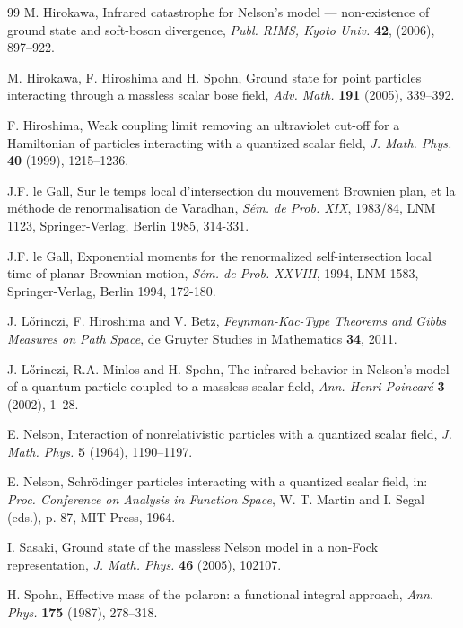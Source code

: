 \documentclass[12pt]{article}
\providecommand{\1}{\mathbb{1}}
\begin{document}
{\begin{thebibliography}{99}
M. Hirokawa,
Infrared catastrophe for Nelson's model --- non-existence of ground state and soft-boson
divergence, {\it Publ. RIMS, Kyoto Univ.}  \textbf{42},  (2006), 897--922.


M. Hirokawa, F. Hiroshima and H. Spohn,
Ground state for point particles interacting through a massless scalar bose field,
{\it Adv. Math.} {\bf 191} (2005), 339--392.

F. Hiroshima,
Weak coupling limit removing an ultraviolet cut-off for a Hamiltonian of
particles interacting with a quantized scalar field, {\it  J. Math. Phys.} {\bf  40}
(1999), 1215--1236.


  J.F. le Gall, Sur le temps local d'intersection du
mouvement Brownien plan, et la m\'{e}thode de renormalisation de Varadhan,
\textit{S\'{e}m. de Prob. XIX}, 1983/84, LNM 1123, Springer-Verlag, Berlin
1985, 314-331.


  J.F. le Gall, Exponential moments for the
  renormalized self-intersection local time of planar Brownian motion,
\textit{S\'{e}m. de Prob. XXVIII}, 1994, LNM 1583, Springer-Verlag, Berlin
1994, 172-180.

J. L\H orinczi,  F. Hiroshima and V. Betz,
{\it Feynman-Kac-Type Theorems and Gibbs Measures on Path Space}, de Gruyter Studies
in Mathematics {\bf 34},  2011.

J. L\H{o}rinczi, R.A. Minlos and H. Spohn,
The infrared behavior in Nelson's model of a quantum particle coupled to a massless scalar
field, {\it Ann. Henri Poincar\'e}  {\bf 3} (2002), 1--28.

E. Nelson,
Interaction of nonrelativistic particles with a quantized scalar field,
{\it J.   Math.   Phys. } {\bf  5}  (1964),   1190--1197.


E. Nelson,
Schr\"odinger particles interacting with a quantized scalar field, in: {\it Proc. Conference
on Analysis in Function Space}, W. T.  Martin and I. Segal (eds.), p. 87, MIT Press, 1964.

I. Sasaki,
Ground state of the massless Nelson model in a non-Fock representation,
{\it J. Math. Phys.} {\bf 46} (2005), 102107.

H. Spohn,
Effective mass of the polaron: a functional integral approach, {\it Ann. Phys.} {\bf 175}
(1987), 278--318.


\end{thebibliography}}
\end{document}
